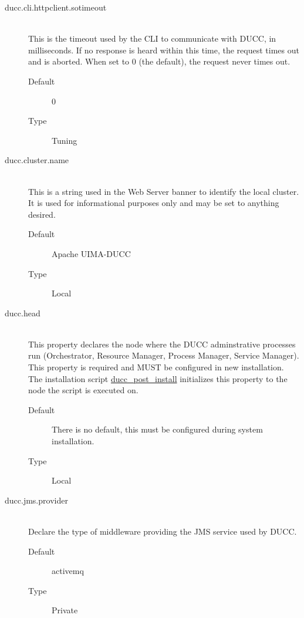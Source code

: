 \begin{description}
       \item[ducc.cli.httpclient.sotimeout] \hfill \\
         This is the timeout used by the CLI to communicate with DUCC, in milliseconds. If no 
         response is heard within this time, the request times out and is aborted. When set to 0 (the 
         default), the request never times out. 
         \begin{description}
           \item[Default] 0 
           \item[Type] Tuning 
          \end{description}

       \item[ducc.cluster.name] \hfill \\
         This is a string used in the Web Server banner to identify the local cluster. It is used
         for informational purposes only and may be set to anything desired.
         \begin{description}
           \item[Default] Apache UIMA-DUCC
           \item[Type] Local 
         \end{description}
          
       \item[ducc.head] \hfill \\
         This property declares the node where the DUCC adminstrative processes run (Orchestrator,
         Resource Manager, Process Manager, Service Manager).  This property is required and MUST be
         configured in new installation.  The installation script
         \hyperref[subsec:install.single-user]{ducc\_post\_install} initializes this property to the
         node the script is executed on.
         \begin{description}
           \item[Default] There is no default, this must be configured during system installation.
           \item[Type] Local 
         \end{description}

       \item[ducc.jms.provider] \hfill \\
         Declare the type of middleware providing the JMS service used by DUCC.
         \begin{description}
           \item[Default] activemq 
           \item[Type]Private 
         \end{description}


\end{description}
